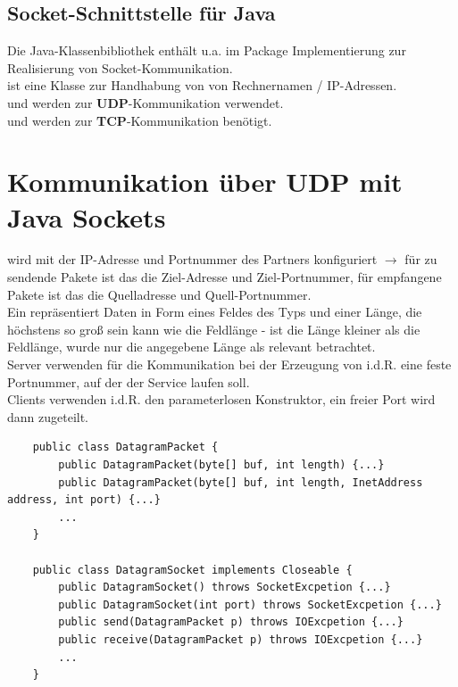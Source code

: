 \subsection{Socket-Schnittstelle für Java}

Die Java-Klassenbibliothek enthält u.a. im Package  Implementierung zur Realisierung von Socket-Kommunikation.\\

\noindent
{} ist eine Klasse zur Handhabung von von Rechnernamen / IP-Adressen.\\

\noindent
{} und  werden zur \textbf{UDP}-Kommunikation verwendet.\\

\noindent
{} und  werden zur \textbf{TCP}-Kommunikation benötigt.


\section{Kommunikation über UDP mit Java Sockets}

 wird mit der IP-Adresse und Portnummer des Partners konfiguriert $\rightarrow$ für zu sendende Pakete ist das die Ziel-Adresse und Ziel-Portnummer, für empfangene Pakete ist das die Quelladresse und Quell-Portnummer.\\

\noindent
Ein  repräsentiert Daten in Form eines Feldes des Typs  und einer Länge, die höchstens so groß sein kann wie die Feldlänge - ist die Länge kleiner als die Feldlänge, wurde nur die angegebene Länge als relevant betrachtet.\\

\noindent
Server verwenden für die Kommunikation bei der Erzeugung von  i.d.R. eine feste Portnummer, auf der der Service laufen soll.\\
Clients verwenden i.d.R. den parameterlosen Konstruktor, ein freier Port wird dann zugeteilt.

\begin{verbatim}
    public class DatagramPacket {
        public DatagramPacket(byte[] buf, int length) {...}
        public DatagramPacket(byte[] buf, int length, InetAddress address, int port) {...}
        ...
    }

    public class DatagramSocket implements Closeable {
        public DatagramSocket() throws SocketExcpetion {...}
        public DatagramSocket(int port) throws SocketExcpetion {...}
        public send(DatagramPacket p) throws IOExcpetion {...}
        public receive(DatagramPacket p) throws IOExcpetion {...}
        ...
    }
\end{verbatim}\\

